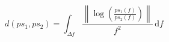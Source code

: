 \documentclass[10pt,a4paper,twoside,twocolumn]{article}
\newcommand*{\rootPath}{../}
\begin{document}
\begin{equation}
	d(ps_1, ps_2) = \int_{\Delta f}\frac{\left\|\log\left(\frac{ps_1(f)}{ps_2(f)}
										\right)\right\|}{f^2}\, \mathrm df
	\label{eq:psd_metric}
\end{equation}


\ifstandalone
	
	
\fi
\end{document}
